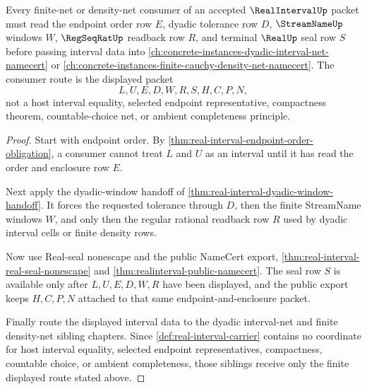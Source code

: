 \begin{theorem}
\label{thm:real-interval-finite-net-consumer}
Every finite-net or density-net consumer of an accepted $\RealIntervalUp$ packet must read the endpoint order row $E$, dyadic tolerance row $D$, $\StreamNameUp$ windows $W$, $\RegSeqRatUp$ readback row $R$, and terminal $\RealUp$ seal row $S$ before passing interval data into \autoref{ch:concrete-instances-dyadic-interval-net-namecert} or \autoref{ch:concrete-instances-finite-cauchy-density-net-namecert}. The consumer route is the displayed packet
$$
L,U,E,D,W,R,S,H,C,P,N,
$$
not a host interval equality, selected endpoint representative, compactness theorem, countable-choice net, or ambient completeness principle.
\end{theorem}
\begin{proof}
Start with endpoint order. By \autoref{thm:real-interval-endpoint-order-obligation}, a consumer cannot treat $L$ and $U$ as an interval until it has read the order and enclosure row $E$.

Next apply the dyadic-window handoff of \autoref{thm:real-interval-dyadic-window-handoff}. It forces the requested tolerance through $D$, then the finite StreamName windows $W$, and only then the regular rational readback row $R$ used by dyadic interval cells or finite density rows.

Now use Real-seal nonescape and the public NameCert export, \autoref{thm:real-interval-real-seal-nonescape} and \autoref{thm:realinterval-public-namecert}. The seal row $S$ is available only after $L,U,E,D,W,R$ have been displayed, and the public export keeps $H,C,P,N$ attached to that same endpoint-and-enclosure packet.

Finally route the displayed interval data to the dyadic interval-net and finite density-net sibling chapters. Since \autoref{def:real-interval-carrier} contains no coordinate for host interval equality, selected endpoint representatives, compactness, countable choice, or ambient completeness, those siblings receive only the finite displayed route stated above.
\end{proof}

